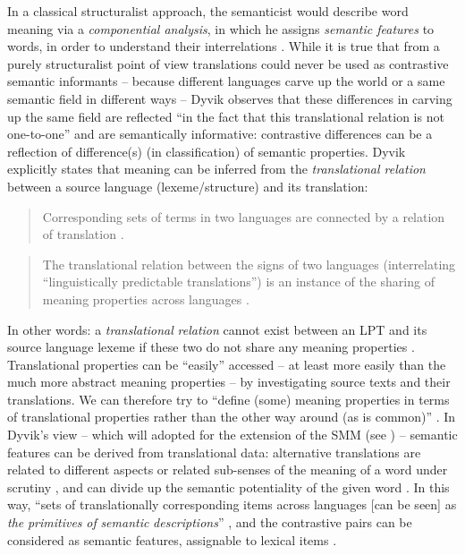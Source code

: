 \hspace*{-1.49399pt}In a classical structuralist approach, the semanticist would describe word meaning via a \textit{componential analysis}, in which he assigns \textit{semantic features} to words, in order to understand their interrelations \citep[28]{langemets_translations_2005}. While it is true that from a purely structuralist point of view translations could never be used as contrastive semantic informants – because different languages carve up the world or a same semantic field in different ways – Dyvik observes that these differences in carving up the same field are reflected “in the fact that this translational relation is not one-to-one” \citep[29]{langemets_translations_2005} and are semantically informative: contrastive differences can be a reflection of difference(s) (in classification) of semantic properties. Dyvik explicitly states that meaning can be inferred from the \textit{translational relation} between a source language (lexeme\slash structure) and its translation:

\begin{quote}
Corresponding sets of terms in two languages are connected by a relation of translation \citep[29]{langemets_translations_2005}.
\end{quote}

\begin{quote}
The translational relation between the signs of two languages (interrelating ``linguistically predictable translations'') is an instance of the sharing of meaning properties across languages \citep[217]{hasselgard_complexity_1999}.
\end{quote}

In other words: a \textit{translational} \textit{relation} cannot exist between an LPT and its source language lexeme if these two do not share any meaning properties \citep[218]{hasselgard_complexity_1999}. Translational properties can be ``easily'' accessed – at least more easily than the much more abstract meaning properties – by investigating source texts and their translations. We can therefore  try to “define (some) meaning properties in terms of translational properties rather than the other way around (as is common)” \citep[218]{hasselgard_complexity_1999}. In Dyvik’s view – which will adopted for the extension of the SMM (see ) – semantic features can be derived from translational data: alternative translations are related to different aspects or related sub-senses of the meaning of a word under scrutiny \citep[31]{langemets_translations_2005}, and can divide up the semantic potentiality of the given word \citep[31]{langemets_translations_2005}. In this way, “sets of translationally corresponding items across languages [can be seen] as \textit{the} \textit{primitives} \textit{of} \textit{semantic} \textit{descriptions}” \citep[31]{langemets_translations_2005}, and the contrastive pairs can be considered as semantic features, assignable to lexical items \citep[31]{langemets_translations_2005}.

